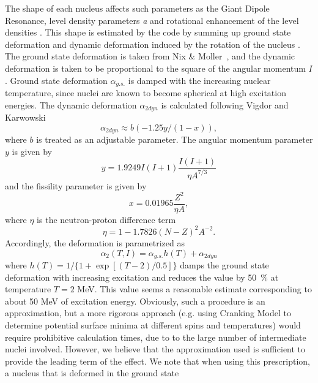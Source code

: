 The shape of each nucleus affects such parameters as the Giant Dipole
Resonance, level density parameters \emph{a} and rotational enhancement of
the level densities%
. This shape is estimated by the code by summing up
ground state deformation and dynamic deformation induced by the rotation of
the nucleus . The ground state deformation 
is taken from Nix \& Moller~\cite{masses}, and the dynamic deformation is
taken to be proportional to the square of the angular momentum $I$. Ground
state deformation $\alpha_{g.s.}$ is damped with the increasing nuclear
temperature, since nuclei are known to become spherical at high excitation
energies. The dynamic deformation $\alpha_{2dyn}$ is calculated following
Vigdor and Karwowski \cite{VK} 
\begin{equation}
\alpha_{2dyn}\approx b(-1.25y/(1-x)),  \label{defor}
\end{equation}
\noindent where $b$ is treated as an adjustable parameter. The angular
momentum parameter $y$ is given by 
\begin{equation}
y=1.9249I(I+1)%
\frac{I(I+1)}{\eta A^{7/3}}
\end{equation}
and the fissility parameter is given by 
\begin{equation}
x=0.01965\frac{Z^{2}}{\eta A},
\end{equation}
\noindent where $\eta$ is the neutron-proton difference term 
\begin{equation}
\eta=1-1.7826(N-Z)^{2}A^{-2}.
\end{equation}
Accordingly, the deformation is parametrized as 
\begin{equation}
\alpha_{2}(T,I)=\alpha_{g.s.}h(T)+\alpha_{2dyn}  \label{totdefor}
\end{equation}
\noindent where $h(T)=1/\{1+\exp[(T-2)/0.5]\}$ damps the ground state
deformation with increasing excitation and reduces the value by 50~\% at
temperature $T=2$ MeV. This value seems a reasonable estimate corresponding
to about 50 MeV of excitation energy. Obviously, such a procedure is an
approximation, but a more rigorous approach (e.g. using Cranking Model to
determine potential surface minima at different spins and temperatures)
would require prohibitive calculation times, due to to the large number of
intermediate nuclei involved. However, we believe that the approximation
used is sufficient to provide the leading term of the effect. We note that
when using this prescription, a nucleus that is deformed in the ground state
